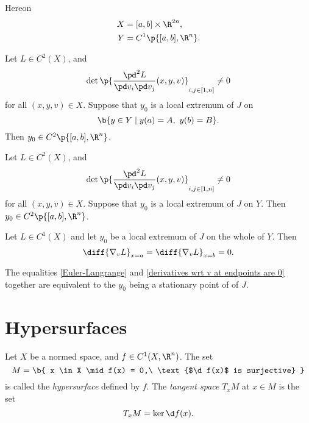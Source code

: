 Hereon
\begin{align*}
  X &= [a, b] \times \R^{2n}, \\
  Y &= C^1\p{[a, b], \R^{n}}.
\end{align*}

\begin{theorem}
  Let $L \in C^2(X)$, and
  $$ \det \p{\frac{\pd^2 L}{\pd v_i \pd v_j}(x,y,v)}_{i,j \in [1, n]} \ne 0 $$
  for all $(x, y, v) \in X$.
  Suppose that $y_0$ is a local extremum of $J$ on
  $$ \b{ y\in Y \mid y(a) = A,\ y(b) = B }. $$
  Then $y_0 \in C^2\p{[a, b], \R^n}$.
\end{theorem}

\begin{theorem}
  Let $L \in C^2(X)$, and
  $$ \det \p{\frac{\pd^2 L}{\pd v_i \pd v_j}(x,y,v)}_{i,j \in [1, n]} \ne 0 $$
  for all $(x, y, v) \in X$.
  Suppose that $y_0$ is a local extremum of $J$ on $Y$.
  Then $y_0 \in C^2\p{[a, b], \R^n}$.
\end{theorem}

\begin{theorem}
  Let $L \in C^1(X)$ and let $y_0$ be a local extremum of $J$ on the whole of $Y$. Then
  \begin{equation}
    \label{derivatives wrt v at endpoints are 0}
    \diff{\nabla_v L}_{x=a} = \diff{\nabla_v L}_{x=b} = 0.
  \end{equation}
\end{theorem}

\begin{lemma}
  The equalities \eqref{Euler-Langrange} and \eqref{derivatives wrt v at endpoints are 0} together are equivalent to the $y_0$ being a stationary point of of $J$.
\end{lemma}

\wtf

\section{Hypersurfaces}

\begin{definition}
  Let $X$ be a normed space, and $f \in C^1(X, \R^n)$.
  The set 
  $$ M = \b{ x \in X \mid f(x) = 0,\ \text{$\d f(x)$ is surjective} } $$
  is called the \emph{hypersurface} defined by $f$.
  The \emph{tangent space} $T_xM$ at $x \in M$ is the set
  $$ T_xM = \ker \d f(x). $$
\end{definition}

